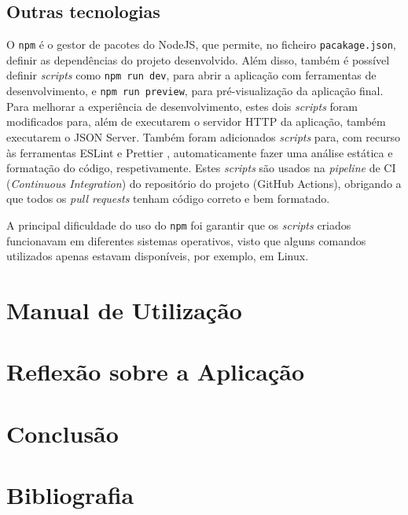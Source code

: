 \documentclass[12pt, a4paper]{article}
\begin{document}
\subsection{Outras tecnologias}

O \texttt{npm} \cite{npm} é o gestor de pacotes do NodeJS, que permite, no ficheiro
\texttt{pacakage.json}, definir as dependências do projeto desenvolvido. Além disso, também é
possível definir \emph{scripts} como \texttt{npm run dev}, para abrir a aplicação com ferramentas de
desenvolvimento, e \texttt{npm run preview}, para pré-visualização da aplicação final. Para melhorar
a experiência de desenvolvimento, estes dois \emph{scripts} foram modificados para, além de
executarem o servidor HTTP da aplicação, também executarem o JSON Server. Também foram adicionados
\emph{scripts} para, com recurso às ferramentas ESLint \cite{eslint} e Prettier \cite{prettier},
automaticamente fazer uma análise estática e formatação do código, respetivamente. Estes
\emph{scripts} são usados na \emph{pipeline} de CI (\emph{Continuous Integration}) do repositório do
projeto (GitHub Actions), obrigando a que todos os \emph{pull requests} tenham código correto e bem
formatado.

A principal dificuldade do uso do \texttt{npm} foi garantir que os \emph{scripts} criados
funcionavam em diferentes sistemas operativos, visto que alguns comandos utilizados apenas estavam
disponíveis, por exemplo, em Linux.

\section{Manual de Utilização}
\label{user-manual}

\section{Reflexão sobre a Aplicação}

\section{Conclusão}

\begingroup
\section{Bibliografia}
\renewcommand{\section}[2]{}
\end{document}
